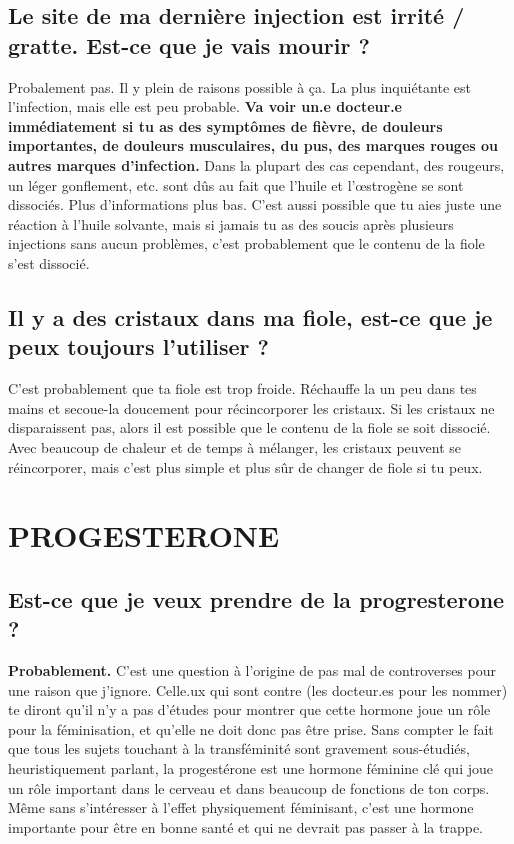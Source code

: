 \documentclass{article}
\begin{document}
\subsection{Le site de ma dernière injection est irrité / gratte. Est-ce que je vais mourir ?}

Probalement pas. Il y plein de raisons possible à ça. La plus inquiétante est l'infection, mais elle est peu probable. \textbf{Va voir un.e docteur.e immédiatement si tu as des symptômes de fièvre, de douleurs importantes, de douleurs musculaires, du pus, des marques rouges ou autres marques d'infection.} Dans la plupart des cas cependant, des rougeurs, un léger gonflement, etc. sont dûs au fait que l'huile et l'œstrogène se sont dissociés. Plus d'informations plus bas. C'est aussi possible que tu aies juste une réaction à l'huile solvante, mais si jamais tu as des soucis après plusieurs injections sans aucun problèmes, c'est probablement que le contenu de la fiole s'est dissocié.

\subsection{Il y a des cristaux dans ma fiole, est-ce que je peux toujours l'utiliser ?}

C'est probablement que ta fiole est trop froide. Réchauffe la un peu dans tes mains et secoue-la doucement pour récincorporer les cristaux. Si les cristaux ne disparaissent pas, alors il est possible que le contenu de la fiole se soit dissocié. Avec beaucoup de chaleur et de temps à mélanger, les cristaux peuvent se réincorporer, mais c'est plus simple et plus sûr de changer de fiole si tu peux.
 

\section{PROGESTERONE}

\subsection{Est-ce que je veux prendre de la progresterone ?}

\textbf{Probablement.} C'est une question à l'origine de pas mal de controverses pour une raison que j'ignore. Celle.ux qui sont contre (les docteur.es pour les nommer) te diront qu'il n'y a pas d'études pour montrer que cette hormone joue un rôle pour la féminisation, et qu'elle ne doit donc pas être prise. Sans compter le fait que tous les sujets touchant à la transféminité sont gravement sous-étudiés, heuristiquement parlant, la progestérone est une hormone féminine clé qui joue un rôle important dans le cerveau et dans beaucoup de fonctions de ton corps. Même sans s'intéresser à l'effet physiquement féminisant, c'est une hormone importante pour être en bonne santé et qui ne devrait pas passer à la trappe. 
\end{document}
